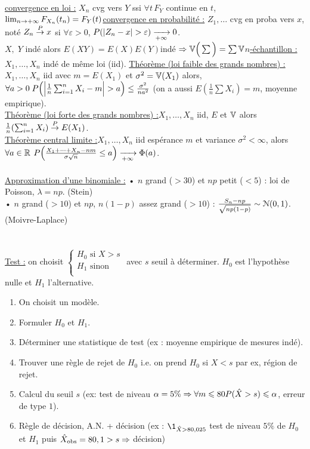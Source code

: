 \documentclass[12 pt]{book}
\begin{document}
\text{ }\\
\underline{convergence en loi :} $X_n$ cvg vers $Y$ ssi $\forall t\, F_Y$ continue en $t$, $\lim_{n\to +\infty} F_{X_n}(t_n)=F_Y(t)$\newline \underline{convergence en probabilité :} $Z_1,\dots$ cvg en proba vers $x$, noté $Z_n \overset{P}{\rightarrow} x$ si $\forall\varepsilon>0$, $P(|Z_n - x|>\varepsilon)\TI 0$.\\
$X,\; Y$ indé alors $E(XY)=E(X)E(Y)$\qquad indé $\Rightarrow \mathbb{V}\Big(\sum\Big) = \sum \mathbb{V}$\newline \underline{$n$-échantillon :} $X_1,\dots,X_n$ indé de même loi (iid).\newline
\underline{Théorème (loi faible des grands nombres) :} $X_1,\dots,X_n$ iid avec $m=E(X_1)$ et $\sigma^2=\mathbb{V}(X_1)$ alors, $\forall a>0\; P\Big(\Big| \frac{1}{n} \SN X_i -m\Big|>a\Big)\leq \frac{\sigma^2}{na^2}$ (on a aussi $E(\frac{1}{n}\sum X_i) =m$, moyenne empirique).\\
\underline{Théorème (loi forte des grands nombres) :}$X_1,\dots,X_n$ iid, $E$ et $\mathbb{V}$ alors $\frac{1}{n}(\sum_{i=1}^n X_i)\overset{P}{\rightarrow} E(X_1)$.\\
\underline{Théorème central limite :}$X_1,\dots,X_n$ iid espérance $m$ et variance $\sigma^2<\infty$, alors $\forall a\in \mathbb{R}$ $P\Big(\frac{X_1 + \dots + X_n - nm}{\sigma\sqrt{n}}\leq a\Big) \xrightarrow[+\infty]{} \Phi(a)$.\\
\text{ }\\
\underline{Approximation d'une binomiale :}
• $n$ grand ($>30$) et $np$ petit ($<5$) : loi de Poisson, $\lambda=np$. (Stein)\\
• $n$ grand ($>10$) et $np$, $n(1-p)$ assez grand ($>10$) : $\frac{S_n-np}{\sqrt{np(1-p)}}\sim \mathcal{N}(0,1)$. (Moivre-Laplace)\\
\text{ }\\
\text{ }\\
\underline{Test :} on choisit $\begin{cases}H_0\text{ si }X>s\\ H_1\text{ sinon}\\\end{cases}$ avec $s$ seuil à déterminer. $H_0$ est l'hypothèse nulle et $H_1$ l'alternative.\\
\begin{enumerate}[label=\protect\circled{\arabic*}]
\item On choisit un modèle.
\item Formuler $H_0$ et $H_1$.
\item Déterminer une statistique de test (ex : moyenne empirique de mesures indé).
\item Trouver une règle de rejet de $H_0$ i.e. on prend $H_0$ si $X<s$ par ex, région de rejet.
\item Calcul du seuil $s$ (ex: test de niveau $\alpha=5\%\Rightarrow\forall m\leqslant 80 P(\hat{X}>s)\leqslant\alpha$, erreur de type $1$).
\item Règle de décision, A.N. + décision (ex : $\1_{\hat{X}>80,025}$ test de niveau $5\%$ de $H_0$ et $H_1$ puis $\hat{X}_{\text{obs}}=80,1>s\Rightarrow$ décision)
\end{enumerate}
\end{document}
